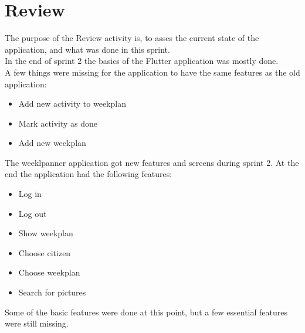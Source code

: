 \section{Review}

The purpose of the Review activity is, to asses the current state of the application, and what was done in this sprint.\\
In the end of sprint 2 the basics of the Flutter application was mostly done.\\
A few things were missing for the application to have the same features as the old application:
\begin{itemize}
    \item Add new activity to weekplan
    \item Mark activity as done
    \item Add new weekplan
\end{itemize}

The weeklpanner application got new features and screens during sprint 2. At the end the application had the following features:
\begin{itemize}
    \item Log in
    \item Log out
    \item Show weekplan 
    \item Choose citizen
    \item Choose weekplan
    \item Search for pictures
\end{itemize}

Some of the basic features were done at this point, but a few essential features were still missing. 